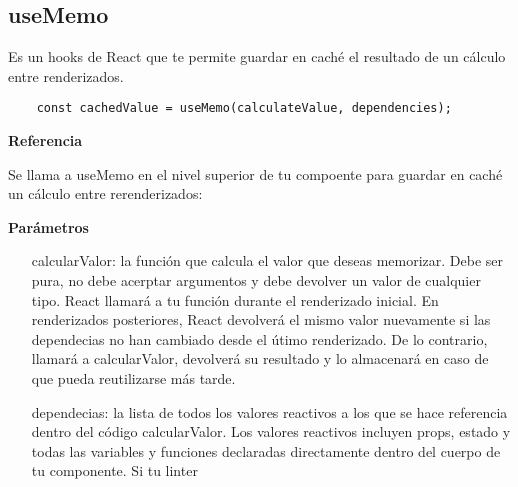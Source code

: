 \subsection{useMemo}

Es un hooks de React que te permite guardar en cach\'e el resultado de un c\'alculo entre renderizados. 

\begin{lstlisting}
    const cachedValue = useMemo(calculateValue, dependencies);
\end{lstlisting}

{\Large\bf Referencia}

Se llama a useMemo en el nivel superior de tu compoente para guardar en cach\'e un c\'alculo entre rerenderizados: 

{\normalsize\bf Par\'ametros}


\begin{itemize}
    \item[calcularValor: ] la funci\'on que calcula el valor que deseas memorizar. Debe ser pura, no debe acerptar argumentos y debe devolver un valor de cualquier tipo. React llamar\'a a tu funci\'on durante el renderizado inicial. 
    En renderizados posteriores, React devolver\'a el mismo valor nuevamente si las dependecias no han cambiado desde el \'utimo renderizado. De lo contrario, llamar\'a a calcularValor, devolver\'a su resultado y lo almacenar\'a en caso de que pueda reutilizarse m\'as tarde.
    \item[dependecias: ] la lista de todos los valores reactivos a los que se hace referencia dentro del c\'odigo calcularValor. Los valores reactivos incluyen props, estado y todas las variables y funciones declaradas directamente dentro del cuerpo de tu componente. Si tu linter
\end{itemize}


